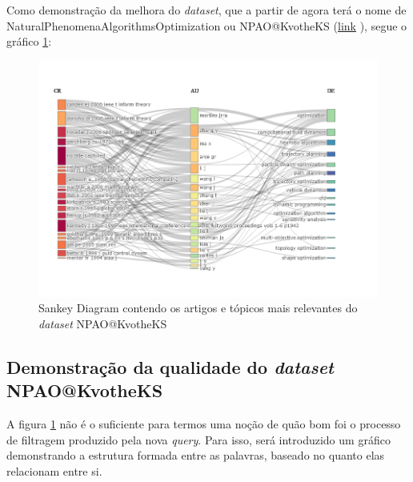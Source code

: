     Como demonstração da melhora do \emph{dataset}, que a partir de agora terá o nome de NaturalPhenomenaAlgorithmsOptimization ou NPAO@KvotheKS (\href{https://github.com/jhcf/Comput-Experim-20212/tree/main/experiments/KvotheKS/PesqBibliogr/AlgoritmosSimulacaoOptica-Dinamica/WoS-20220202/Better_Query}{link} ), segue o gráfico \ref{fig:KvotheKS:Final_Data_Set}:
    
    \begin{figure}[H]
    \centering
    \includegraphics[width=1.3\textwidth]{experiments/KvotheKS/PesqBibliogr/AlgoritmosSimulacaoOptica-Dinamica/WoS-20220202/Dataset/AU_CR_DE.png}
    \caption{Sankey Diagram contendo os artigos e tópicos mais relevantes do \emph{dataset} NPAO@KvotheKS}
    \label{fig:KvotheKS:Final_Data_Set}
\end{figure}

\subsection{Demonstração da qualidade do \emph{dataset} NPAO@KvotheKS}

    A figura \ref{fig:KvotheKS:Final_Data_Set} não é o suficiente para termos uma noção de quão bom foi o processo de filtragem produzido pela nova \emph{query}. Para isso, será introduzido um gráfico demonstrando a estrutura formada entre as palavras, baseado no quanto elas relacionam entre si.
    
